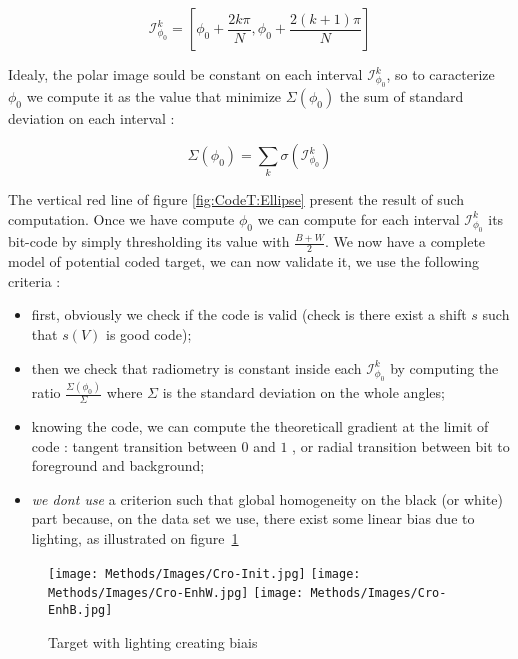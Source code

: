 \begin{equation}
	\mathcal{I}^{k}_{\phi_0} = [\phi_0 +\frac{2k \pi}{N},\phi_0 +\frac{2(k+1) \pi}{N}]
\end{equation}

Idealy, the polar image sould be constant on each interval $\mathcal{I}^{k}_{\phi_0}$, so 
to caracterize $\phi_0$ we compute it  as the value that minimize $\Sigma(\phi_0)$ 
the sum of standard deviation on each interval :

\begin{equation}
	\Sigma(\phi_0) =  \sum _k \sigma(\mathcal{I}^{k}_{\phi_0})
\end{equation}

The vertical red line of figure \ref{fig:CodeT:Ellipse} present the result of such computation.
Once we have compute $\phi_0$ we can compute for each interval $\mathcal{I}^{k}_{\phi_0}$ its 
bit-code by simply thresholding its value with $\frac{B+W}{2}$. We now have a complete model
of potential coded target, we can now validate it,  we use the following criteria :

\begin{itemize}
       \item first, obviously we check if the code is valid (check is there exist a shift $s$ such
	     that $s(V)$ is good code);

       \item then we check that radiometry is constant inside each $\mathcal{I}^{k}_{\phi_0}$
             by computing the ratio $\frac{\Sigma(\phi_0)}{\Sigma}$ where  $\Sigma$ is
             the standard deviation on the whole angles;

        \item  knowing the code, we can compute the theoreticall gradient at the limit of code :
               tangent transition between $0$ and $1$ , or radial transition between bit to foreground
               and background;

        \item \emph{we dont use} a criterion such that global homogeneity on the black (or white) part
              because, on the data set we use, there exist some linear bias due to lighting,
		as illustrated on figure~\ref{fig:CodeT:EllipseBias}
	
\end{itemize}


\begin{figure}
\centering
	\texttt{[image: Methods/Images/Cro-Init.jpg]}
	\texttt{[image: Methods/Images/Cro-EnhW.jpg]}
	\texttt{[image: Methods/Images/Cro-EnhB.jpg]}
	\caption{Target with lighting creating biais}
\label{fig:CodeT:EllipseBias}
\end{figure}


